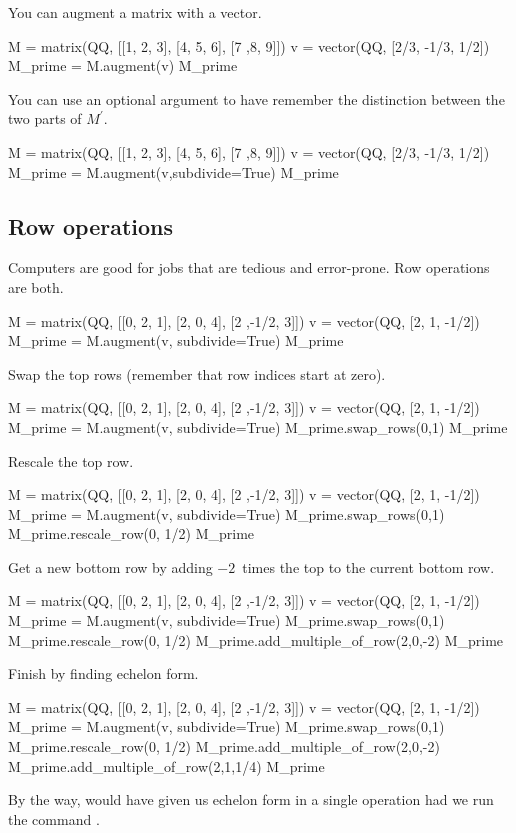 You can augment a matrix with a vector.
\begin{sageoutput}
M = matrix(QQ, [[1, 2, 3], [4, 5, 6], [7 ,8, 9]])
v = vector(QQ, [2/3, -1/3, 1/2])
M_prime = M.augment(v)
M_prime
\end{sageoutput}
\noindent
You can use an optional argument to
have \Sage{} remember the distinction between the two parts 
of $M^\prime$.
\begin{sageoutput}[d,0,2]
M = matrix(QQ, [[1, 2, 3], [4, 5, 6], [7 ,8, 9]])
v = vector(QQ, [2/3, -1/3, 1/2])
M_prime = M.augment(v,subdivide=True)
M_prime                              
\end{sageoutput}



\subsection{Row operations}
Computers are good for jobs that are tedious and error-prone.
Row operations are both.

\begin{sageoutput}
M = matrix(QQ, [[0, 2, 1], [2, 0, 4], [2 ,-1/2, 3]])
v = vector(QQ, [2, 1, -1/2])                        
M_prime = M.augment(v, subdivide=True)              
M_prime                                             
\end{sageoutput}
\noindent
Swap the top rows (remember that row indices start at zero).
\begin{sageoutput}[d,0,3]
M = matrix(QQ, [[0, 2, 1], [2, 0, 4], [2 ,-1/2, 3]])
v = vector(QQ, [2, 1, -1/2])                        
M_prime = M.augment(v, subdivide=True)              
M_prime.swap_rows(0,1)
M_prime
\end{sageoutput}
\noindent
Rescale the top row.
\begin{sageoutput}[d,0,4]
M = matrix(QQ, [[0, 2, 1], [2, 0, 4], [2 ,-1/2, 3]])
v = vector(QQ, [2, 1, -1/2])                        
M_prime = M.augment(v, subdivide=True)              
M_prime.swap_rows(0,1)
M_prime.rescale_row(0, 1/2)
M_prime
\end{sageoutput}
\noindent
Get a new  bottom row by adding $-2$~times the top to the current bottom
row.
\begin{sageoutput}[d,0,5]
M = matrix(QQ, [[0, 2, 1], [2, 0, 4], [2 ,-1/2, 3]])
v = vector(QQ, [2, 1, -1/2])                        
M_prime = M.augment(v, subdivide=True)              
M_prime.swap_rows(0,1)
M_prime.rescale_row(0, 1/2)
M_prime.add_multiple_of_row(2,0,-2)
M_prime
\end{sageoutput}
\noindent
Finish by finding echelon form.
\begin{sageoutput}[d,0,6]
M = matrix(QQ, [[0, 2, 1], [2, 0, 4], [2 ,-1/2, 3]])
v = vector(QQ, [2, 1, -1/2])                        
M_prime = M.augment(v, subdivide=True)              
M_prime.swap_rows(0,1)
M_prime.rescale_row(0, 1/2)
M_prime.add_multiple_of_row(2,0,-2)
M_prime.add_multiple_of_row(2,1,1/4)
M_prime                             
\end{sageoutput}
\noindent
By the way,
\Sage{} would have given us echelon form in a single operation 
had we run the command
.

